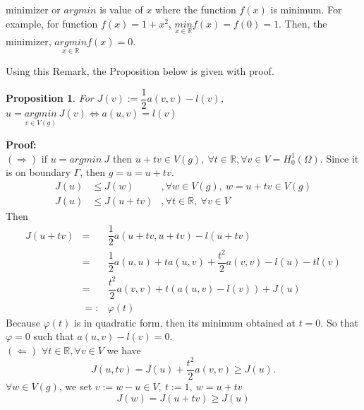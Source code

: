 \documentclass[a4paper,10pt]{article}
\newtheorem{prop}{Proposition}
\begin{document}
minimizer or $ argmin $ is value of $ x $ where the function $ f(x) $ is minimum. For example, for function $ f(x)=1+x^2 $, $ \underset{x \in \mathbb{R}}{min} f(x) = f(0) =1 $. Then, the minimizer, $ \underset{x \in \mathbb{R}}{argmin} f(x) = 0 $.

Using this Remark, the Proposition below is given with proof.
\begin{prop}
	For $ J(v) := \dfrac{1}{2} a(v,v) -l (v) $,
	$ u = \underset{v \in V(g)}{argmin} \ J(v) \iff a(u,v)=l(v) $
\end{prop}

\textbf{Proof:}\\
$ (\Rightarrow) $ if $ u = argmin \ J $ then $ u+tv \in V(g) , \ \forall t \in \mathbb{R}, \forall v \in V = H_{0}^{1} (\Omega) $. Since it is on boundary $ \Gamma $, then $ g=u=u+tv $.
\begin{eqnarray}\nonumber
J(u) &\leq J(w) &, \forall w \in V(g), \ w=u+tv \in V(g)\\ \nonumber
J(u) &\leq J(u+tv) &, \forall t \in \mathbb{R}, \ \forall v \in V
\end{eqnarray}
Then
\begin{eqnarray}\nonumber
J(u+tv) &=& \dfrac{1}{2} a(u+tv,u+tv)-l(u+tv)\\ \nonumber
&=& \dfrac{1}{2} a(u,u) + t a(u,v) + \dfrac{t^2}{2} a (v,v) - l(u) - t l(v)\\ \nonumber
&=& \dfrac{t^2}{2} a (v,v) + t (a(u,v) - l(v)) + J(u)\\ \nonumber
&=:& \varphi(t)
\end{eqnarray}
Because $ \varphi(t) $ is in quadratic form, then its minimum obtained at $ t=0 $. So that $ \varphi =0 $ such that $ a(u,v) - l(v) =0 $.\\
$ (\Leftarrow) $ $ \forall t \in \mathbb{R}, \forall v \in V $ we have
\begin{equation}\nonumber
J(u,tv) = J(u) + \dfrac{t^2}{2} a(v,v) \geq J(u).
\end{equation}
$ \forall w \in V(g) $, we set $ v := w -u \in V , \ t:=1 , \ w=u+tv $
\begin{equation}\nonumber
J(w) = J(u+tv) \geq J(u)
\end{equation}
\end{document}
